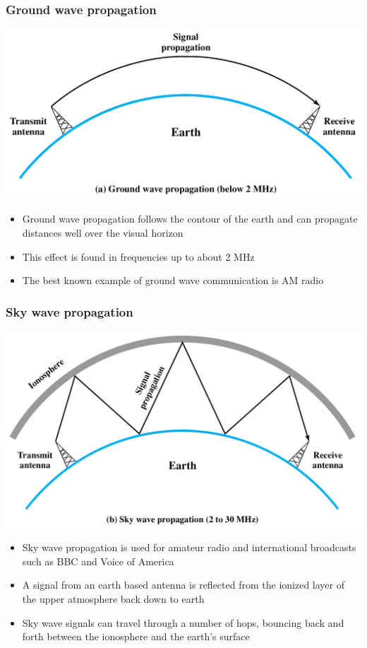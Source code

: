 \documentclass[pdflatex,compress]{beamer}
\begin{document}
\begin{frame}
	\frametitle{Ground wave propagation}
	\begin{center}
		\includegraphics[height=0.4\textheight]{img/img23}
	\end{center}
	\begin{itemize}
		\item Ground wave propagation follows the contour of the earth and can propagate distances well over the visual horizon
		\item This effect is found in frequencies up to about 2 MHz
		\item The best known example of ground wave communication is AM radio
	\end{itemize}
\end{frame}

\begin{frame}
	\frametitle{Sky wave propagation}
	\begin{center}
		\includegraphics[height=0.4\textheight]{img/img24}
	\end{center}
	\begin{itemize}
		\item Sky wave propagation is used for amateur radio and international broadcasts such as BBC and Voice of America
		\item A signal from an earth based antenna is reflected from the ionized layer of the upper atmosphere back down to earth
		\item Sky wave signals can travel through a number of hops, bouncing back and forth between the ionosphere and the earth's surface
	\end{itemize}
\end{frame}
\end{document}
